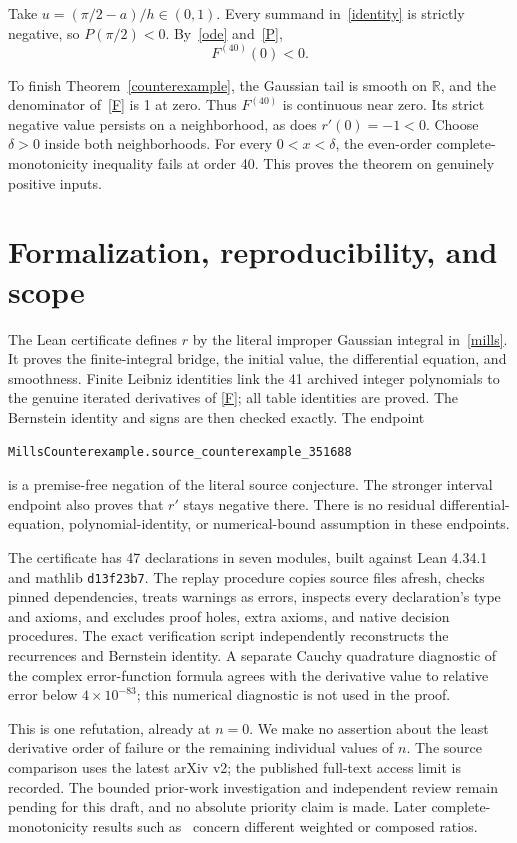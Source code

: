 \documentclass[11pt]{article}
\newcommand{\R}{\mathbb R}
\begin{document}
Take $u=(\pi/2-a)/h\in(0,1)$. Every summand in~\eqref{identity} is
strictly negative, so $P(\pi/2)<0$. By~\eqref{ode} and~\eqref{P},
\[
 F^{(40)}(0)<0.
\]

To finish Theorem~\ref{counterexample}, the Gaussian tail is smooth on
$\R$, and the denominator of~\eqref{F} is 1 at zero. Thus $F^{(40)}$ is
continuous near zero. Its strict negative value persists on a
neighborhood, as does $r'(0)=-1<0$. Choose $\delta>0$ inside both
neighborhoods. For every $0<x<\delta$, the even-order complete-monotonicity
inequality fails at order 40. This proves the theorem on genuinely positive
inputs.

\section{Formalization, reproducibility, and scope}
The Lean certificate defines $r$ by the literal improper Gaussian integral
in~\eqref{mills}. It proves the finite-integral bridge, the initial value,
the differential equation, and smoothness. Finite Leibniz identities link
the 41 archived integer polynomials to the genuine iterated derivatives of
\eqref{F}; all table identities are proved. The Bernstein identity and
signs are then checked exactly. The endpoint
\begin{center}
\texttt{MillsCounterexample.source\_counterexample\_351688}
\end{center}
is a premise-free negation of the literal source conjecture. The stronger
interval endpoint also proves that $r'$ stays negative there. There is no
residual differential-equation, polynomial-identity, or numerical-bound
assumption in these endpoints.

The certificate has 47 declarations in seven modules, built against Lean
4.34.1 and mathlib \texttt{d13f23b7}. The replay procedure copies source
files afresh, checks pinned dependencies, treats warnings as errors,
inspects every declaration's type and axioms, and excludes proof holes,
extra axioms, and native decision procedures. The exact verification script
independently reconstructs the recurrences and Bernstein identity. A
separate Cauchy quadrature diagnostic of the complex error-function formula
agrees with the derivative value to relative error below $4\times10^{-83}$;
this numerical diagnostic is not used in the proof.

This is one refutation, already at $n=0$. We make no assertion about the
least derivative order of failure or the remaining individual values of
$n$. The source comparison uses the latest arXiv v2; the published full-text
access limit is recorded. The bounded prior-work investigation and
independent review remain pending for this draft, and no absolute priority
claim is made. Later complete-monotonicity results such as~\cite{Yang}
concern different weighted or composed ratios.
\end{document}
